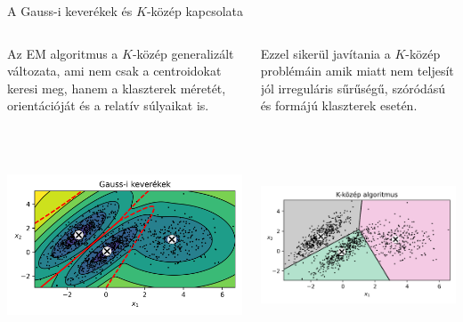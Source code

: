 \documentclass[english, aspectratio=169]{beamer}
\begin{document}
\begin{frame}{A Gauss-i keverékek és $K$-közép kapcsolata}
\begin{columns}
\begin{column}{.5\textwidth}
Az EM algoritmus a $K$-közép generalizált változata, ami nem csak a centroidokat keresi meg, hanem a klaszterek méretét, orientációját és a relatív súlyaikat is.\par\smallskip
\begin{center}
\includegraphics[width=7cm, height=7cm, keepaspectratio]{images/generative_19.png}
\end{center}
\end{column}
\begin{column}{.5\textwidth}
Ezzel sikerül javítania a $K$-közép problémáin amik miatt nem teljesít jól irreguláris sűrűségű, szóródású és formájú klaszterek esetén.
\begin{center}
\includegraphics[width=7cm, height=7cm, keepaspectratio]{images/generative_18.png}
\end{center}
\end{column}
\end{columns}
\end{frame}
\end{document}
